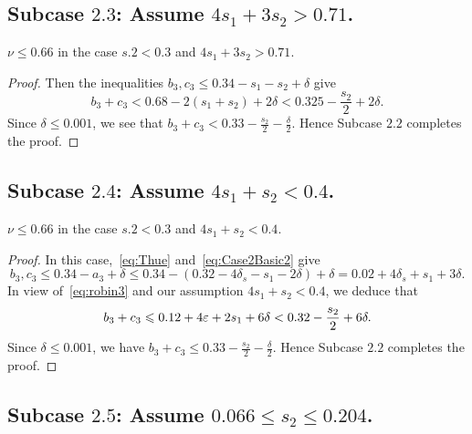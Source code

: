 \subsection*{Subcase $\mathbf{2.3}$: Assume $4s_1+3s_2>0.71$.}

\begin{lemma}\label{lem:Subcase2.3}
  \leanok
  $\nu \leq 0.66$ in the case $s.2 < 0.3$ and $4s_1+3s_2>0.71$.
\end{lemma}
\begin{proof}
  \leanok
  Then the inequalities $b_3,c_3 \le 0.34-s_1-s_2+ \delta$ give
  \[
  b_3+c_3<0.68-2(s_1+s_2)+2\delta<
  0.325 -\frac{s_2}{2}+2\delta.
  \]
  Since $\delta\leq 0.001$, we see that $b_3+c_3<0.33-\frac{s_2}{2}-\frac{\delta}{2}$.
  Hence Subcase $\mathbf{2.2}$ completes the proof.
\end{proof}

\subsection*{Subcase $\mathbf{2.4}$: Assume $4s_1+s_2<0.4$.}

\begin{lemma}\label{lem:Subcase2.4}
  \leanok
  $\nu \leq 0.66$ in the case $s.2 < 0.3$ and $4s_1+s_2<0.4$.
\end{lemma}
\begin{proof}
  \leanok
  In this case,~\eqref{eq:Thue} and~\eqref{eq:Case2Basic2} give
  \[
  b_3,c_3 \le 0.34-a_3+\delta \le 0.34 - (0.32-4\delta_s-s_1-2\delta) +\delta= 0.02+4\delta_s+s_1+3\delta.
  \]
  In view of~\eqref{eq:robin3} and
  our assumption $4s_1+s_2<0.4$, we deduce that
  \begin{align*}
  b_3+c_3 \leqslant 0.12+4\varepsilon + 2s_1+6\delta <
  0.32-\frac{s_2}{2}+6\delta.
  \end{align*}
  Since $\delta\leq 0.001$, we have $b_3+c_3 \le 0.33-\frac{s_2}{2}-\frac{\delta}{2}$. Hence
  Subcase $\mathbf{2.2}$ completes the proof.
\end{proof}


\subsection*{Subcase $\mathbf{2.5}$: Assume $0.066\leq s_2\leq
0.204$.}

